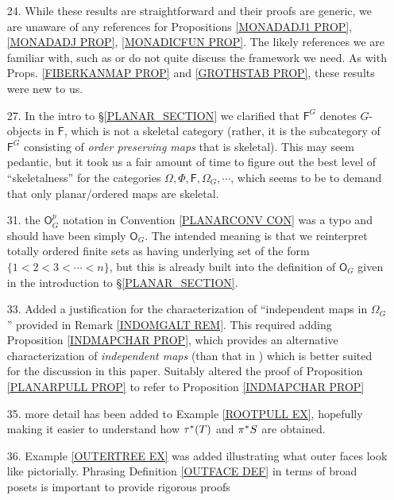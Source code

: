 \documentclass{article}
\begin{document}
\begin{itemize}
	\item[24.] While these results are straightforward 
	and their proofs are generic, 
	we are unaware of any references for Propositions \ref{MONADADJ1 PROP}, \ref{MONADADJ PROP}, \ref{MONADICFUN PROP}. The likely references we are familiar with, such as 
	\cite{Bo94} or \cite{Ri17} do not quite discuss the framework we need.
	As with Props. 
	\ref{FIBERKANMAP PROP} and \ref{GROTHSTAB PROP},
	these results were new to us.
	
	\item[27.] In the intro to \S \ref{PLANAR_SECTION} we
	clarified that $\mathsf{F}^G$ denotes $G$-objects in $\mathsf{F}$,
	which is not a skeletal category (rather, it is the subcategory of $\mathsf{F}^G$ consisting of \emph{order preserving maps} that is skeletal).
	This may seem pedantic,
	but it took us a fair amount of time to figure out the best level of ``skeletalness'' for the categories 
	$\Omega, \Phi, \mathsf{F}, \Omega_G, \cdots$, 
	which seems to be to demand that only planar/ordered maps are skeletal.
	
	\item[31.] the $\mathsf{O}^p_G$ notation in 
	Convention \ref{PLANARCONV CON}
	was a typo and should have been simply $\mathsf{O}_G$.
	The intended meaning is that we reinterpret totally ordered finite sets as having underlying set of the form
	$\{1<2<3<\cdots <n\}$,
	but this is already built into the definition of 
	$\mathsf{O}_G$ given in the introduction to
	\S \ref{PLANAR_SECTION}.

  \item[33.] Added a justification for 
	the characterization of ``independent maps in $\Omega_G$''
	provided in Remark \ref{INDOMGALT REM}.
	This required adding 
	Proposition \ref{INDMAPCHAR PROP},
	which provides an alternative characterization of \emph{independent maps}
	(than that in \cite[Def. 5.28]{Pe17})
	which is better suited for the discussion in this paper.
	Suitably altered the proof of Proposition \ref{PLANARPULL PROP}
	to refer to Proposition \ref{INDMAPCHAR PROP}
        
	\item[35.] more detail has been added to Example \ref{ROOTPULL EX}, hopefully making it easier to understand 
	how $\tau^{\**}(T)$ and $\pi^{\**}S$ are obtained.
	
	\item[36.] Example \ref{OUTERTREE EX} was added illustrating what outer faces look like pictorially. 
	Phrasing Definition \ref{OUTFACE DEF} 
	in terms of broad posets   
	is important to provide rigorous proofs
	

\end{itemize}
\end{document}
